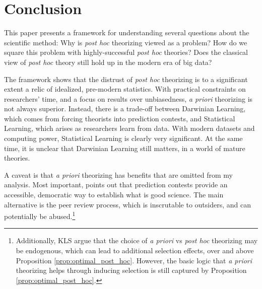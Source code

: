 \documentclass[12pt,english]{article}
\theoremstyle{plain}
\theoremstyle{plain}
\begin{document}
\section{Conclusion}

This paper presents a framework for understanding several questions about the scientific method: Why is \emph{post hoc} theorizing viewed as a problem? How do we square this problem with highly-successful \emph{post hoc} theories? Does the classical view of \emph{post hoc} theory still hold up in the modern era of big data? 

The framework shows that the distrust of \emph{post hoc} theorizing is to a significant extent a relic of idealized, pre-modern statistics. With practical constraints on researchers' time, and a focus on results over unbiasedness, \emph{a priori} theorizing is not always superior. Instead, there is a trade-off between  Darwinian Learning, which comes from forcing theorists into prediction contests, and Statistical Learning, which arises as researchers learn from data. With  modern datasets and computing power, Statistical Learning is clearly very significant. At the same time, it is unclear that Darwinian Learning still matters, in a world of mature theories.

A caveat is that \emph{a priori} theorizing has benefits that are omitted from my analysis. Most important, \citet{barnes2008paradox} points out that prediction contests provide an accessible, democratic way to establish what is good science. The main alternative is the peer review process, which is inscrutable to outsiders, and can potentially be abused.\footnote{Additionally, KLS argue that the choice of \emph{a priori} vs \emph{post hoc} theorizing may be endogenous, which can lead to additional selection effects, over and above Proposition \ref{prop:optimal_post_hoc}. However, the basic logic that \emph{a priori} theorizing helps through inducing selection is still captured by Proposition \ref{prop:optimal_post_hoc}.}
\end{document}

